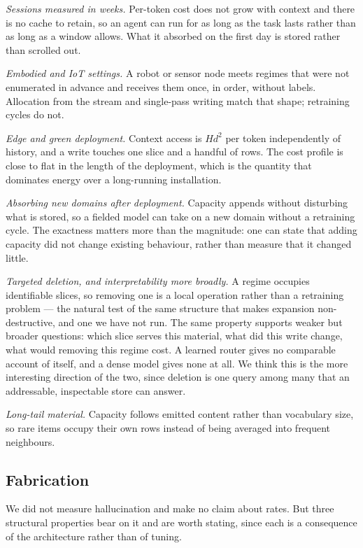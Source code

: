 \documentclass[11pt,a4paper]{article}
\begin{document}
\emph{Sessions measured in weeks.} Per-token cost does not grow with context
and there is no cache to retain, so an agent can run for as long as the task
lasts rather than as long as a window allows. What it absorbed on the first day
is stored rather than scrolled out.

\emph{Embodied and IoT settings.} A robot or sensor node meets regimes that
were not enumerated in advance and receives them once, in order, without
labels. Allocation from the stream and single-pass writing match that shape;
retraining cycles do not.

\emph{Edge and green deployment.} Context access is $Hd^2$ per token
independently of history, and a write touches one slice and a handful of rows.
The cost profile is close to flat in the length of the deployment, which is the
quantity that dominates energy over a long-running installation.

\emph{Absorbing new domains after deployment.} Capacity appends without
disturbing what is stored, so a fielded model can take on a new domain without
a retraining cycle. The exactness matters more than the magnitude: one can
state that adding capacity did not change existing behaviour, rather than
measure that it changed little.

\emph{Targeted deletion, and interpretability more broadly.} A regime occupies
identifiable slices, so removing one is a local operation rather than a
retraining problem --- the natural test of the same structure that makes
expansion non-destructive, and one we have not run. The same property supports
weaker but broader questions: which slice serves this material, what did this
write change, what would removing this regime cost. A learned router gives no
comparable account of itself, and a dense model gives none at all. We think
this is the more interesting direction of the two, since deletion is one query
among many that an addressable, inspectable store can answer.

\emph{Long-tail material.} Capacity follows emitted content rather than
vocabulary size, so rare items occupy their own rows instead of being averaged
into frequent neighbours.

\subsection{Fabrication}

We did not measure hallucination and make no claim about rates. But three
structural properties bear on it and are worth stating, since each is a
consequence of the architecture rather than of tuning.
\end{document}
